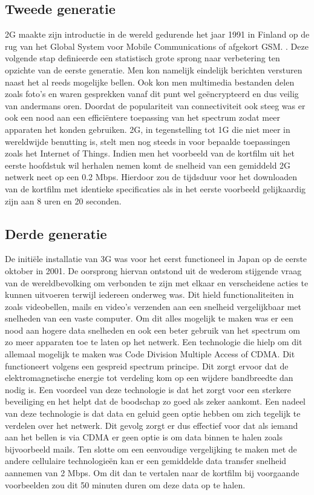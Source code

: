 \subsection{Tweede generatie}

2G maakte zijn introductie in de wereld gedurende het jaar 1991 in Finland op de rug van het Global System voor Mobile Communications of afgekort GSM. \autocite{Galazzo2020}. Deze volgende stap definieerde een statistisch grote sprong naar verbetering ten opzichte van de eerste generatie. Men kon namelijk eindelijk berichten versturen naast het al reeds mogelijke bellen. Ook kon men multimedia bestanden delen zoals foto's en waren gesprekken vanaf dit punt wel geëncrypteerd en dus veilig van andermans oren. Doordat de populariteit van connectiviteit ook steeg was er ook een nood aan een efficiëntere toepassing van het spectrum zodat meer apparaten het konden gebruiken. 2G, in tegenstelling tot 1G die niet meer in wereldwijde benutting is, stelt men nog steeds in voor bepaalde toepassingen zoals het Internet of Things. \autocite{Henke2021} Indien men het voorbeeld van de kortfilm uit het eerste hoofdstuk wil herhalen nemen komt de snelheid van een gemiddeld 2G netwerk neet op een 0.2 Mbps. \autocite{Galazzo2020} Hierdoor zou de tijdsduur voor het downloaden van de kortfilm met identieke specificaties als in het eerste voorbeeld gelijkaardig zijn aan 8 uren en 20 seconden. \autocite{Wooding2024}

\subsection{Derde generatie}

De initiële installatie van 3G was voor het eerst functioneel in Japan op de eerste oktober in 2001. De oorsprong hiervan ontstond uit de wederom stijgende vraag van de wereldbevolking om verbonden te zijn met elkaar en verscheidene acties te kunnen uitvoeren terwijl iedereen onderweg was. Dit hield functionaliteiten in zoals videobellen, mails en video's verzenden aan een snelheid vergelijkbaar met snelheden van een vaste computer. Om dit alles mogelijk te maken was er een nood aan hogere data snelheden en ook een beter gebruik van het spectrum om zo meer apparaten toe te laten op het netwerk. \autocite{Dulcey2020} Een technologie die hielp om dit allemaal mogelijk te maken was Code Division Multiple Access of CDMA. Dit functioneert volgens een gespreid spectrum principe. Dit zorgt ervoor dat de elektromagnetische energie tot verdeling kom op een wijdere bandbreedte dan nodig is. Een voordeel van deze technologie is dat het zorgt voor een sterkere beveiliging en het helpt dat de boodschap zo goed als zeker aankomt. Een nadeel van deze technologie is dat data en geluid geen optie hebben om zich tegelijk te verdelen over het netwerk. Dit gevolg zorgt er dus effectief voor dat als iemand aan het bellen is via CDMA er geen optie is om data binnen te halen zoals bijvoorbeeld mails. \autocite{Fendelman2021} Ten slotte om een eenvoudige vergelijking te maken met de andere cellulaire technologieën kan er een gemiddelde data transfer snelheid aannemen van 2 Mbps.\autocite{Galazzo2020} Om dit dan te vertalen naar de kortfilm bij voorgaande voorbeelden zou dit 50 minuten duren om deze data op te halen. \autocite{Wooding2024}

